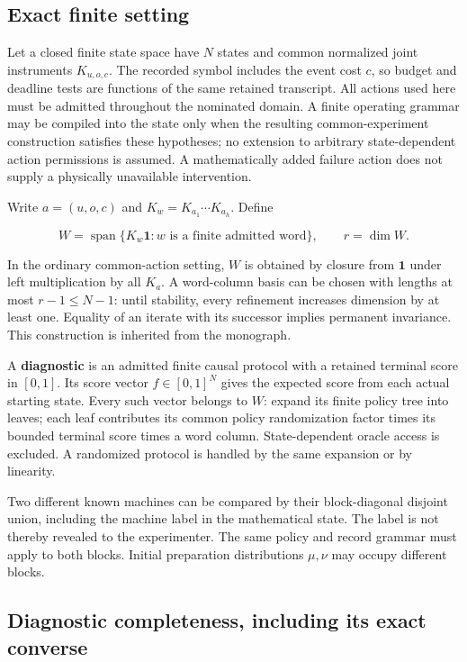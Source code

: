 \documentclass[
  11pt,
  a4paper,
]{article}
\begin{document}
\subsection{Exact finite setting}\label{exact-finite-setting}

Let a closed finite state space have \(N\) states and common normalized
joint instruments \(K_{u,o,c}\). The recorded symbol includes the event
cost \(c\), so budget and deadline tests are functions of the same
retained transcript. All actions used here must be admitted throughout
the nominated domain. A finite operating grammar may be compiled into
the state only when the resulting common-experiment construction
satisfies these hypotheses; no extension to arbitrary state-dependent
action permissions is assumed. A mathematically added failure action
does not supply a physically unavailable intervention.

Write \(a=(u,o,c)\) and \(K_w=K_{a_1}\cdots K_{a_h}\). Define

\[
W=\operatorname{span}\{K_w\mathbf 1:w\text{ is a finite admitted word}\},\qquad r=\dim W.
\]

In the ordinary common-action setting, \(W\) is obtained by closure from
\(\mathbf1\) under left multiplication by all \(K_a\). A word-column
basis can be chosen with lengths at most \(r-1\le N-1\): until
stability, every refinement increases dimension by at least one.
Equality of an iterate with its successor implies permanent invariance.
This construction is inherited from the monograph.

A \textbf{diagnostic} is an admitted finite causal protocol with a
retained terminal score in \([0,1]\). Its score vector \(f\in[0,1]^N\)
gives the expected score from each actual starting state. Every such
vector belongs to \(W\): expand its finite policy tree into leaves; each
leaf contributes its common policy randomization factor times its
bounded terminal score times a word column. State-dependent oracle
access is excluded. A randomized protocol is handled by the same
expansion or by linearity.

Two different known machines can be compared by their block-diagonal
disjoint union, including the machine label in the mathematical state.
The label is not thereby revealed to the experimenter. The same policy
and record grammar must apply to both blocks. Initial preparation
distributions \(\mu,\nu\) may occupy different blocks.

\subsection{Diagnostic completeness, including its exact
converse}\label{diagnostic-completeness-including-its-exact-converse}
\end{document}
